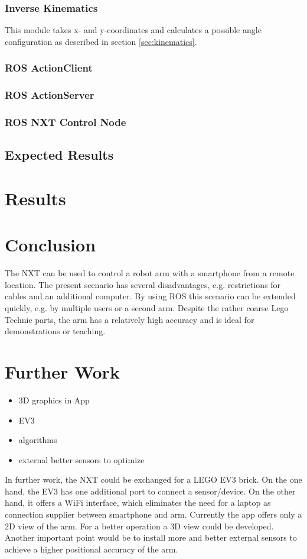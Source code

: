 \documentclass[conference]{IEEEtran}
\begin{document}
\subsubsection{Inverse Kinematics}
This module takes x- and y-coordinates and calculates a possible angle configuration as described in section \ref{sec:kinematics}.

\subsubsection{ROS ActionClient}\label{sec:actionclient}

\subsubsection{ROS ActionServer}

\subsubsection{ROS NXT Control Node}

\subsection{Expected Results}\label{sec:expectedresults}

\section{Results}

\section{Conclusion}
The NXT can be used to control a robot arm with a smartphone from a remote location. The present scenario has several disadvantages, e.g. restrictions for cables and an additional computer.
By using ROS this scenario can be extended quickly, e.g. by multiple users or a second arm. Despite the rather coarse Lego Technic parts, the arm has a relatively high accuracy and is ideal for demonstrations or teaching.

\section{Further Work}
\begin{itemize}
	\item 3D graphics in App
	\item EV3
	\item algorithms
	\item external better sensors to optimize
\end{itemize}
In further work, the NXT could be exchanged for a LEGO EV3 brick. On the one hand, the EV3 has one additional port to connect a sensor/device. On the other hand, it offers a WiFi interface, which eliminates the need for a laptop as connection supplier between smartphone and arm.
Currently the app offers only a 2D view of the arm. For a better operation a 3D view could be developed.
Another important point would be to install more and better external sensors to achieve a higher positional accuracy of the arm.
\end{document}
